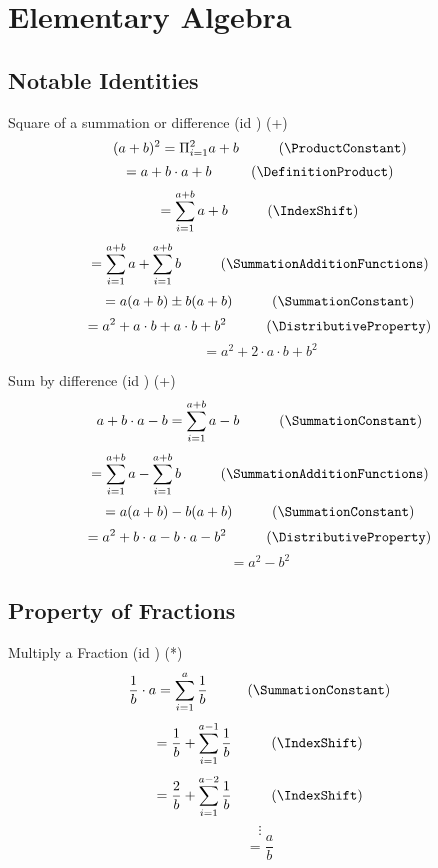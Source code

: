\documentclass{book}
\begin{document}
        \section{Elementary Algebra}
            \subsection{Notable Identities}
                Square of a summation or difference (id \SquareSummationDifference) (+)
                    \[(a + b)^2 = \Pi^2_{i=1} a + b \hspace{1cm} (\ProductConstant)\]
                    \[=  a + b \cdot a + b \hspace{1cm} (\DefinitionProduct)\]
                    \[= \sum^{a + b}_{i=1} a + b \hspace{1cm} (\IndexShift)\]
                    \[= \sum^{a + b}_{i=1} a + \sum^{a + b}_{i=1} b \hspace{1cm} (\SummationAdditionFunctions)\]
                    \[= a(a + b) \pm b(a + b) \hspace{1cm} (\SummationConstant)\]
                    \[= a^2 + a \cdot b + a \cdot b + b^2 \hspace{1cm} (\DistributiveProperty)\]
                    \[= a^2 + 2 \cdot a \cdot b + b^2\]
    
                Sum by difference (id \SumDifference) (+)
                    \[a + b \cdot a - b = \sum^{a + b}_{i=1} a - b \hspace{1cm} (\SummationConstant)\]
                    \[= \sum^{a + b}_{i=1} a - \sum^{a + b}_{i=1} b \hspace{1cm} (\SummationAdditionFunctions)\]
                    \[= a(a + b) - b(a + b) \hspace{1cm} (\SummationConstant)\]
                    \[= a^2 + b \cdot a - b \cdot a - b^2 \hspace{1cm} (\DistributiveProperty)\]
                    \[= a^2 - b^2\]

            \subsection{Property of Fractions}
                Multiply a Fraction (id \MultiplyFraction) (*)
                \[\frac{1}{b} \cdot a = \sum^a_{i=1}\frac{1}{b} \hspace{1cm} (\SummationConstant)\]
                \[= \frac{1}{b} + \sum^{a - 1}_{i=1}\frac{1}{b} \hspace{1cm} (\IndexShift)\]
                \[= \frac{2}{b} + \sum^{a - 2}_{i=1}\frac{1}{b} \hspace{1cm} (\IndexShift)\]
                \[\vdots\]
                \[= \frac{a}{b}\]
            
\end{document}
